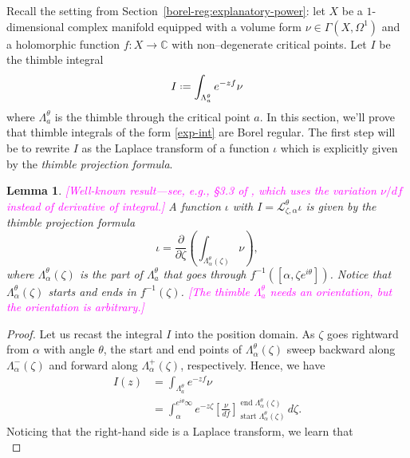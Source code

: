 \documentclass{article}
\newcommand{\C}{\mathbb{C}}
\newcommand*{\defeq}{\mathrel{\vcenter{\baselineskip0.5ex \lineskiplimit0pt
                     \hbox{\scriptsize.}\hbox{\scriptsize.}}}%
                     =}
\newcommand{\laplace}{\mathcal{L}}
\theoremstyle{definition}
\theoremstyle{plain}
\newtheorem{lemma}[definition]{Lemma}
\begin{document}
{Recall the setting from Section~\ref{borel-reg:explanatory-power}: let $X$ be a $1$-dimensional complex manifold equipped with a volume form $\nu\in\Gamma(X,\Omega^1)$ and a holomorphic function $f\colon X\to\C$ with non--degenerate critical points. Let $I$ be the thimble integral 
\begin{equation}\label{exp-int}
I \defeq \int_{\Lambda_a^\theta} e^{-zf} \nu
\end{equation}
where $\Lambda_a^\theta$ is the thimble through the critical point $a$. In this section, we'll prove that thimble integrals of the form \eqref{exp-int} are Borel regular. The first step will be to rewrite $I$ as the Laplace transform of a function $\iota$ which is explicitly given by the \textit{thimble projection formula}.%
\begin{lemma}\label{lem:thimble_proj_formula-proof}
\textcolor{magenta}{[Well-known result---see, e.g., \S 3.3 of \cite{pham}, which uses the variation $\nu/df$ instead of derivative of integral.]} A function $\iota$ with $I = \laplace_{\zeta, \alpha}^\theta \iota$ is given by the {\em thimble projection formula}
\begin{equation}\label{eqn:formula-proof}
    \iota = \frac{\partial}{\partial \zeta} \left( \int_{\Lambda_\alpha^\theta(\zeta)}\nu \right),
\end{equation}
where $\Lambda_\alpha^\theta(\zeta)$ is the part of $\Lambda_a^\theta$ that goes through $f^{-1}([\alpha,\zeta e^{i\theta}])$. Notice that $\Lambda_\alpha^\theta(\zeta)$ starts and ends in $f^{-1}(\zeta)$. \textcolor{magenta}{[The thimble $\Lambda_a^\theta$ needs an orientation, but the orientation is arbitrary.]}
\end{lemma}
\begin{proof}
    Let us recast the integral $I$ into the position domain. As $\zeta$ goes rightward from $\alpha$ with angle $\theta$, the start and end points of $\Lambda_\alpha^\theta(\zeta)$ sweep backward along $\Lambda^-_\alpha(\zeta)$ and forward along $\Lambda^+_\alpha(\zeta)$, respectively. Hence, we have
\begin{align*}
I(z) & = \int_{\Lambda_a^\theta} e^{-zf} \nu \\
& = \int_{\alpha}^{e^{i\theta} \infty} e^{-z\zeta} \left[\frac{\nu}{df}\right]_{\operatorname{start} \Lambda_\alpha^\theta(\zeta)}^{\operatorname{end} \Lambda_\alpha^\theta(\zeta)}\,d\zeta.
\end{align*}
Noticing that the right-hand side is a Laplace transform, we learn that
\begin{equation}\label{thimble-difference}

\end{equation}
\end{proof}}
\end{document}
